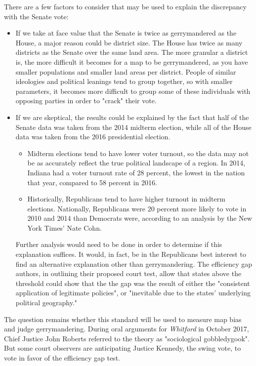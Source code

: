 \documentclass[sigconf]{acmart}
\begin{document}
There are a few factors to consider that may be used to explain the discrepancy with the Senate vote:
\begin{itemize}
    \item If we take at face value that the Senate is twice as gerrymandered as the House, a major reason could be district size. The House has twice as many districts as the Senate over the same land area. The more granular a district is, the more difficult it becomes for a map to be gerrymandered, as you have smaller populations and smaller land areas per district. People of similar ideologies and political leanings tend to group together, so with smaller parameters, it becomes more difficult to group some of these individuals with opposing parties in order to "crack" their vote. 
    \item If we are skeptical, the results could be explained by the fact that half of the Senate data was taken from the 2014 midterm election, while all of the House data was taken from the 2016 presidential election. 
    \begin{itemize}
        \item Midterm elections tend to have lower voter turnout, so the data may not be as accurately reflect the true political landscape of a region. In 2014, Indiana had a voter turnout rate of 28 percent, the lowest in the nation that year\cite{2014turnout}, compared to 58 percent in 2016.\cite{2016turnout}
        \item Historically, Republicans tend to have higher turnout in midterm elections. Nationally, Republicans were 20 percent more likely to vote in 2010 and 2014 than Democrats were, according to an analysis by the New York Times' Nate Cohn. \cite{cohn}
    \end{itemize}
    Further analysis would need to be done in order to determine if this explanation suffices. It would, in fact, be in the Republicans best interest to find an alternative explanation other than gerrymandering. The efficiency gap authors, in outlining their proposed court test, allow that states above the threshold could show that the the gap was the result of either the "consistent application of legitimate policies", or "inevitable due to the states' underlying political geography."\cite{chicagothreshold}
\end{itemize}

The question remains whether this standard will be used to measure map bias and judge gerrymandering. During oral arguments for \textit{Whitford} in October 2017, Chief Justice John Roberts referred to the theory as "sociological gobbledygook".\cite{gilltranscript} But some court observers are anticipating Justice Kennedy, the swing vote, to vote in favor of the efficiency gap test.\cite{analysis}
\end{document}

